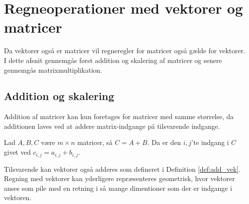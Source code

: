 \section{Regneoperationer med vektorer og matricer}

Da vektorer også er matricer vil regneregler for matricer også gælde for vektorer. I dette afsnit gennemgås først addition og skalering af matricer og senere gennemgås matrixmultiplikation.\\

\subsection{Addition og skalering}
Addition af matricer kan kun foretages for matricer med samme størrelse, da additionen laves ved at addere matrix-indgange på tilsvarende indgange.

\begin{defn}
Lad $A, B, C$ være $m \times n$ matricer, så $C=A+B$. Da er den $i,j$'te indgang i $C$ givet ved $c_{i,j} = a_{i,j} + b_{i,j}$. 
\end{defn}




Tilsvarende kan vektorer også adderes som defineret i Definition \ref{def:add_vek}. Regning med vektorer kan yderligere repræsenteres geometrisk, hvor vektorer anses som pile med en retning i så mange dimentioner som der er indgange i vektoren.

